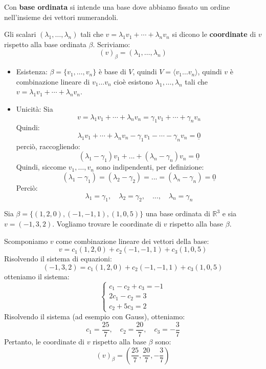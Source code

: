 \documentclass[
  a4paper,
]{article}
\begin{document}
\begin{notebox}
Con \textbf{base ordinata} si intende una base dove abbiamo fissato un
ordine nell'insieme dei vettori numerandoli.
\end{notebox}

\begin{definitionbox}
Gli scalari \((\lambda_1,\ldots,\lambda_n)\) tali che
\(v=\lambda_1 v_1+\cdots+\lambda_n v_n\) si dicono le
\textbf{coordinate} di \(v\) rispetto alla base ordinata \(\beta\).
Scriviamo: \[
(v)_{\beta} = (\lambda_1,\ldots,\lambda_n)
\]
\end{definitionbox}

\begin{proofbox}
\begin{itemize}
\item
  Esistenza: \(\beta=\{v_1,\ldots,v_n\}\) è base di \(V\), quindi
  \(V = \langle v_1 \dots v_n\rangle\), quindi \(v\) è combinazione
  lineare di \(v_1 \dots v_n\) cioè esistono
  \(\lambda_1,\ldots,\lambda_n\) tali che
  \(v=\lambda_1 v_1+\cdots+\lambda_n v_n\).
\item
  Unicità: Sia \[
  v=\lambda_1 v_1+\cdots+\lambda_n v_n = \gamma_1 v_1+\cdots+\gamma_n v_n
  \] Quindi: \[
  \lambda_1 v_1+\cdots+\lambda_n v_n - \gamma_1 v_1-\cdots-\gamma_n v_n = \underline{0}
  \] perciò, raccogliendo: \[
    (\lambda_1 - \gamma_1)v_1 + ... + (\lambda_n - \gamma_n)v_n = \underline{0}
   \] Quindi, siccome \(v_1,\ldots,v_n\) sono indipendenti, per
  definizione: \[
    (\lambda_1 - \gamma_1) = (\lambda_2 - \gamma_2) = ... = (\lambda_n - \gamma_n) = \underline{0}
   \] Perciò: \[
   \lambda_1 = \gamma_1, \quad \lambda_2 = \gamma_2, \quad ... , \quad \lambda_n = \gamma_n
   \]
\end{itemize}
\end{proofbox}

\begin{examplebox}
Sia \(\beta = \{(1, 2, 0), (-1, -1, 1), (1, 0, 5)\}\) una base ordinata
di \(\mathbb{R}^3\) e sia \(v = (-1, 3, 2)\). Vogliamo trovare le
coordinate di \(v\) rispetto alla base \(\beta\).

Scomponiamo \(v\) come combinazione lineare dei vettori della base: \[
v = c_1 (1, 2, 0) + c_2 (-1, -1, 1) + c_3 (1, 0, 5)
\] Risolvendo il sistema di equazioni: \[
(-1, 3, 2) = c_1 (1, 2, 0) + c_2 (-1, -1, 1) + c_3 (1, 0, 5)
\] otteniamo il sistema: \[
\begin{cases}
c_1 - c_2 + c_3 = -1 \\
2c_1 - c_2 = 3 \\
c_2 + 5c_3 = 2
\end{cases}
\] Risolvendo il sistema (ad esempio con Gauss), otteniamo: \[
c_1 = \frac{25}{7}, \quad c_2 = \frac{20}{7}, \quad c_3 = -\frac{3}{7}
\] Pertanto, le coordinate di \(v\) rispetto alla base \(\beta\) sono:
\[
(v)_{\beta} = \left(\frac{25}{7}, \frac{20}{7}, -\frac{3}{7}\right)
\]
\end{examplebox}
\end{document}
